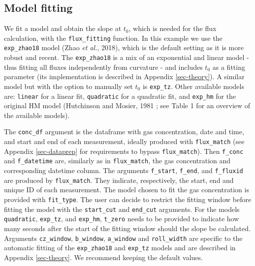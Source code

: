 \documentclass[
  letterpaper,
  DIV=11,
  numbers=noendperiod]{scrartcl}
\begin{document}
\subsection{Model fitting}\label{model-fitting}

We fit a model and obtain the slope at \(t_0\), which is needed for the
flux calculation, with the \texttt{flux\_fitting} function. In this
example we use the \texttt{exp\_zhao18} model (Zhao \emph{et al.},
2018), which is the default setting as it is more robust and recent. The
\texttt{exp\_zhao18} is a mix of an exponential and linear model - thus
fitting all fluxes independently from curvature - and includes \(t_0\)
as a fitting parameter (its implementation is described in Appendix
\ref{sec-theory}). A similar model but with the option to manually set
\(t_0\) is \texttt{exp\_tz}. Other available models are: \texttt{linear}
for a linear fit, \texttt{quadratic} for a quadratic fit, and
\texttt{exp\_hm} for the original HM model (Hutchinson and Mosier, 1981
; see Table 1 for an overview of the available models).

The \texttt{conc\_df} argument is the dataframe with gas concentration,
date and time, and start and end of each measurement, ideally produced
with \texttt{flux\_match} (see Appendix \ref{sec-dataprep} for
requirements to bypass \texttt{flux\_match}). Then \texttt{f\_conc} and
\texttt{f\_datetime} are, similarly as in \texttt{flux\_match}, the gas
concentration and corresponding datetime column. The arguments
\texttt{f\_start}, \texttt{f\_end}, and \texttt{f\_fluxid} are produced
by \texttt{flux\_match}. They indicate, respectively, the start, end and
unique ID of each measurement. The model chosen to fit the gas
concentration is provided with \texttt{fit\_type}. The user can decide
to restrict the fitting window before fitting the model with the
\texttt{start\_cut} and \texttt{end\_cut} arguments. For the models
\texttt{quadratic}, \texttt{exp\_tz}, and \texttt{exp\_hm},
\texttt{t\_zero} needs to be provided to indicate how many seconds after
the start of the fitting window should the slope be calculated.
Arguments \texttt{cz\_window}, \texttt{b\_window}, \texttt{a\_window}
and \texttt{roll\_width} are specific to the automatic fitting of the
\texttt{exp\_zhao18} and \texttt{exp\_tz} models and are described in
Appendix \ref{sec-theory}. We recommend keeping the default values.
\end{document}
